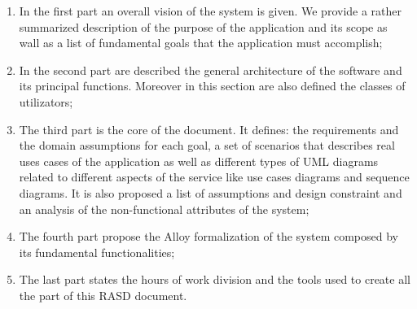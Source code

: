 \begin{enumerate}
  \item In the first part an overall vision of the system is given. We provide a rather summarized description of the purpose of the application and its scope as wall as a list of fundamental goals that the application must accomplish;
  \item In the second part are described the general architecture of the software and its principal functions. Moreover in this section are also defined the classes of utilizators;
  \item The third part is the core of the document. It defines: the requirements and the domain assumptions for each goal, 
  a set of scenarios that describes real uses cases of the application as well as different types of UML diagrams related to different aspects of the service like use cases diagrams and sequence diagrams. It is also proposed a list of assumptions and design constraint and an analysis of the non-functional attributes of the system;
  \item The fourth part propose the Alloy formalization of the system composed by its fundamental functionalities;  
  \item The last part states the hours of work division and the tools used to create all the part of this RASD document.
\end{enumerate}
